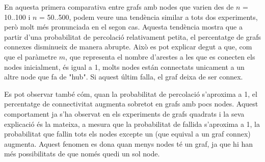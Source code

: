 \documentclass[a4paper]{article}
\begin{document}
	En aquesta primera comparativa entre grafs amb nodes que varien des de $n$ = 10..100 i $n$ = 50..500, podem veure una tendència similar a tots dos experiments, però molt més pronunciada en el segon cas. Aquesta tendència mostra que a partir d'una probabilitat de percolació relativament petita, el percentatge de grafs connexes disminueix de manera abrupte. Això es pot explicar degut a que, com que el paràmetre $m$, que representa el nombre d'arestes a les que es conecten els nodes inicialment,
	és igual a 1, molts nodes están connectats unicament a un altre node que fa de "hub". Si aquest últim falla, el graf deixa de ser connex. 
	
Es pot observar també cóm, quan la probabilitat de percolació s'aproxima a 1, el percentatge de connectivitat augmenta sobretot en grafs amb pocs nodes. Aquest comportament ja s'ha observat en els experiments de grafs quadrats i la seva explicació és la mateixa, a mesura que la probabilitat de fallida s'aproxima a 1, la probabilitat que fallin tots els nodes excepte un
	(que equival a un graf connex) augmenta. Aquest fenomen es dona quan menys nodes té un graf, ja que hi han més possibilitats de que només quedi un sol node.
	
\end{document}
